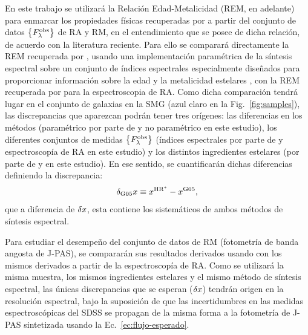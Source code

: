 En este trabajo se utilizará la Relación Edad-Metalicidad (REM, en adelante) para enmarcar los
propiedades físicas recuperadas por \dynbas a partir del conjunto de datos $\set{\sedt[F]{obs}}$ de
RA y RM, en el entendimiento que se posee de dicha relación, de acuerdo con la literatura reciente.
Para ello se comparará directamente la REM recuperada por , usando una
implementación paramétrica de la síntesis espectral sobre un conjunto de índices espectrales
especialmente diseñados para proporcionar información sobre la edad y la metalicidad estelares
\citep{Worthey1994}, con la REM recuperada por \dynbas para la espectroscopia de RA. Como dicha
comparación tendrá lugar en el conjunto de galaxias en la SMG (azul claro en la
Fig.~\ref{fig:samples}), las discrepancias que aparezcan podrán tener tres orígenes: las diferencias
en los métodos (paramétrico por parte de \gal y no paramétrico en este estudio), los diferentes
conjuntos de medidas $\set{\sedt[F]{obs}}$ (índices espectrales por parte de \gal y espectroscopía
de RA en este estudio) y los distintos ingredientes estelares (\bc por parte de \gal y  en
este estudio). En ese sentido, se cuantificarán dichas diferencias definiendo la discrepancia:
%
\begin{equation}
\dig{x} \equiv x^{\text{HR}^*} - x^\text{G05},
\end{equation}
%
que a diferencia de $\dis{x}$, esta contiene los sistemáticos de ambos métodos de síntesis
espectral.

Para estudiar el desempeño del conjunto de datos de RM (fotometría de banda angosta de J-PAS), se
compararán sus resultados derivados usando \dynbas con los mismos derivados a partir de la
espectroscopía de RA. Como se utilizará la misma muestra, los mismos ingredientes estelares y el
mismo método de síntesis espectral, las únicas discrepancias que se esperan ($\dis{x}$) tendrán
origen en la resolución espectral, bajo la suposición de que las incertidumbres en las medidas
espectroscópicas del SDSS se propagan de la misma forma a la fotometría de J-PAS sintetizada usando
la Ec.~\eqref{ec:flujo-esperado}.
